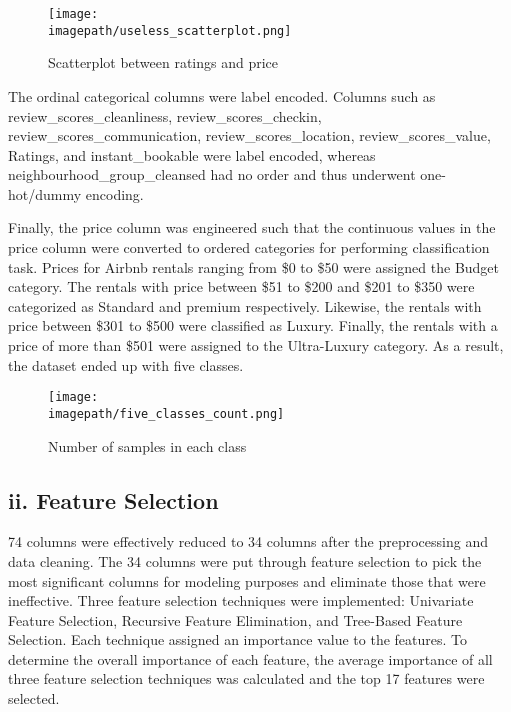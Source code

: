 \documentclass[conference]{IEEEtran}
\newcommand{\imagepath}{C:/Users/Lenovo/Desktop/SEM 6/BIG DATA/BIG_DATA_COURSEWORK/Images for Latex/}
\begin{document}
\begin{figure}[H]
  \centering
  \texttt{[image: \\imagepath/useless\_scatterplot.png]}
  \caption{Scatterplot between ratings and price}
  \label{fig: your_label}
\end{figure}

The ordinal categorical columns were label encoded. Columns such as review\_scores\_cleanliness, review\_scores\_checkin, review\_scores\_communication, review\_scores\_location, review\_scores\_value, Ratings, and instant\_bookable were label encoded, whereas neighbourhood\_group\_cleansed had no order and thus underwent one-hot/dummy encoding. \newline

Finally, the price column was engineered such that the continuous values in the price column were converted to ordered categories for performing classification task. Prices for Airbnb rentals ranging from \$0 to \$50 were assigned the Budget category. The rentals with price between \$51 to \$200 and \$201 to \$350 were categorized as Standard and premium respectively. Likewise, the rentals with price between \$301 to \$500 were classified as Luxury. Finally, the rentals with a price of more than \$501 were assigned to the Ultra-Luxury category. As a result, the dataset ended up with five classes. \newline

\begin{figure}[H]
  \centering
  \texttt{[image: \\imagepath/five\_classes\_count.png]}
  \caption{Number of samples in each class}
  \label{fig: your_label}
\end{figure}


\subsection*{\centering ii. Feature Selection}
74 columns were effectively reduced to 34 columns after the preprocessing and data cleaning. The 34 columns were put through feature selection to pick the most significant columns for modeling purposes and eliminate those that were ineffective. Three feature selection techniques were implemented: Univariate Feature Selection, Recursive Feature Elimination, and Tree-Based Feature Selection. Each technique assigned an importance value to the features. To determine the overall importance of each feature, the average importance of all three feature selection techniques was calculated and the top 17 features were selected. \newline
\end{document}
